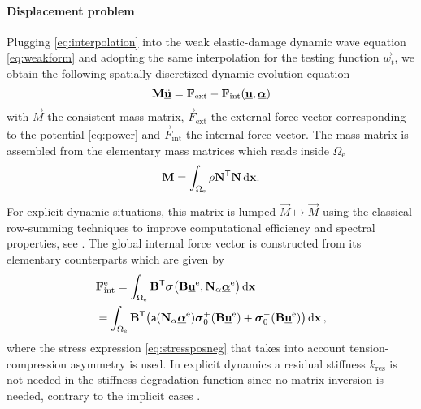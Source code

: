 \paragraph{Displacement problem}
Plugging \eqref{eq:interpolation} into the weak elastic-damage dynamic wave equation \eqref{eq:weakform} and adopting the same interpolation for the testing function $\vec{w}_t$, we obtain the following spatially discretized dynamic evolution equation
\begin{equation} \label{eq:waveeqsdis}
\vec{M}\ddot{\uvec}=\vec{F}_\mathrm{ext}-\vec{F}_\mathrm{int}(\uvec,\dvec)
\end{equation}
with $\vec{M}$ the consistent mass matrix, $\vec{F}_\mathrm{ext}$ the external force vector corresponding to the potential \eqref{eq:power} and $\vec{F}_\mathrm{int}$ the internal force vector. The mass matrix is assembled from the elementary mass matrices which reads inside $\Omega_\mathrm{e}$
\[
\vec{M}=\int_{\Omega_\mathrm{e}}\rho\vec{N}^\mT\vec{N}\dx.
\]
For explicit dynamic situations, this matrix is lumped $\vec{M}\mapsto \overline{\vec{M}}$ using the classical row-summing techniques to improve computational efficiency and spectral properties, see \cite{Hughes:1987}. The global internal force vector is constructed from its elementary counterparts which are given by
\begin{equation} \label{eq:Fint}
\begin{aligned}
& \vec{F}_\mathrm{int}^\me=\int_{\Omega_\me}\vec{B}^\mT\sig\bigl(\vec{B}\uvec^\me,\vec{N}_\alpha\dvec^\me\bigr)\dx \\
&= \int_{\Omega_\me}\vec{B}^\mT\bigl(\mathsf{a}(\vec{N}_\alpha\dvec^\me)\sig_0^+(\vec{B}\uvec^\me)+\sig_0^-(\vec{B}\uvec^\me)\bigr)\dx\,,
\end{aligned}
\end{equation}
where the stress expression \eqref{eq:stressposneg} that takes into account tension-compression asymmetry is used. In explicit dynamics a residual stiffness $k_\mathrm{res}$ is not needed in the stiffness degradation function since no matrix inversion is needed, contrary to the implicit cases \cite{PhamAmorMarigoMaurini:2011,SchlueterWillenbuecherKuhnMueller:2014}.

